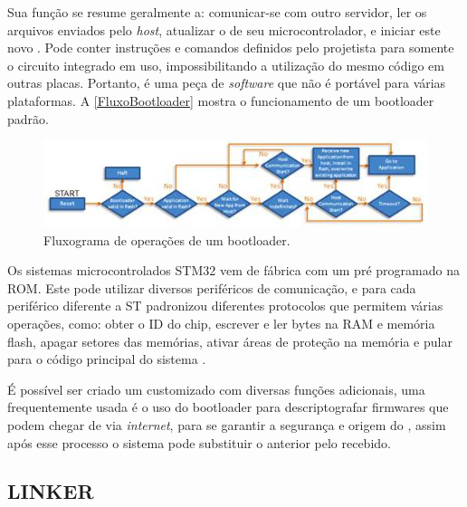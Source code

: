 Sua função se resume geralmente a: comunicar-se com outro servidor, ler os arquivos enviados pelo \textit{host}, atualizar o \firmware de seu microcontrolador, e iniciar este novo \software. 
Pode conter instruções e comandos definidos pelo projetista para somente o circuito integrado em uso, impossibilitando a utilização do mesmo código em outras placas.
Portanto, é uma peça de \textit{software} que não é portável para várias plataformas. A \autoref{FluxoBootloader} mostra o funcionamento de um bootloader padrão. 

\begin{figure}[H]
    \scriptsize
     \centering
     \includegraphics[scale=0.9]{dados/figuras/FluxoBootloader.jpg}
     \caption{Fluxograma de operações de um bootloader.}
     \label{FluxoBootloader}
\end{figure}



Os sistemas microcontrolados STM32 vem de fábrica com um \bootloader pré programado na ROM. Este \bootloader pode utilizar diversos periféricos de comunicação, e para cada periférico diferente a ST padronizou diferentes protocolos que permitem várias operações, como: obter o ID do chip, escrever e ler bytes na RAM e memória flash, apagar setores das memórias, ativar áreas de proteção na memória e pular para o código principal do sistema \cite{Noviello2018}.

É possível ser criado um \bootloader customizado com diversas funções adicionais, uma frequentemente usada é o uso do bootloader para descriptografar firmwares que podem chegar de via \textit{internet}, para se garantir a segurança e origem do \firmware, assim após esse processo o sistema pode substituir o \software anterior pelo recebido. 



\subsection{LINKER}

